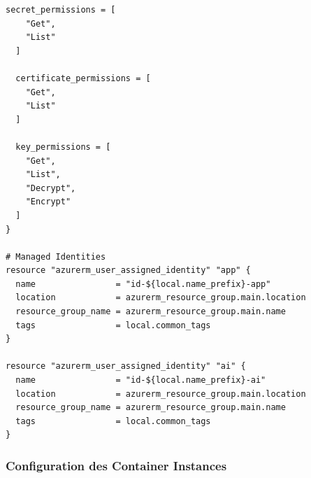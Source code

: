 \documentclass[12pt,a4paper]{report}
\begin{document}
\begin{lstlisting}[language=hcl, caption=Configuration Terraform pour Azure]
  secret_permissions = [
    "Get",
    "List"
  ]
  
  certificate_permissions = [
    "Get",
    "List"
  ]
  
  key_permissions = [
    "Get",
    "List",
    "Decrypt",
    "Encrypt"
  ]
}

# Managed Identities
resource "azurerm_user_assigned_identity" "app" {
  name                = "id-${local.name_prefix}-app"
  location            = azurerm_resource_group.main.location
  resource_group_name = azurerm_resource_group.main.name
  tags                = local.common_tags
}

resource "azurerm_user_assigned_identity" "ai" {
  name                = "id-${local.name_prefix}-ai"
  location            = azurerm_resource_group.main.location
  resource_group_name = azurerm_resource_group.main.name
  tags                = local.common_tags
}
\end{lstlisting}

\subsubsection{Configuration des Container Instances}
\end{document}
